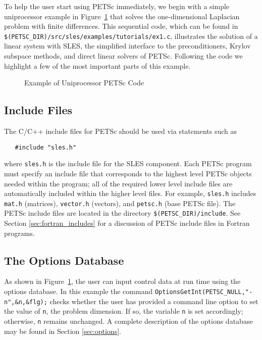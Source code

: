 To help the user start using PETSc immediately, we begin with a simple
uniprocessor example in Figure~\ref{fig:example1} that solves the
one-dimensional Laplacian problem with finite differences.  This
sequential code, which can be found in 
{\tt \$(PETSC\_DIR)/src/sles/examples/tutorials/ex1.c},
illustrates the solution of a linear system with SLES, the simplified
interface to the preconditioners, Krylov subspace methods, and direct
linear solvers of PETSc.  Following the code we highlight a few of the most important
parts of this example.  

\begin{figure}[H]
{\footnotesize
{}
}
\caption{Example of Uniprocessor PETSc Code}
\label{fig:example1}
\end{figure}

\subsection*{Include Files}

The C/C++ include files for PETSc should be used via statements such as
\begin{verbatim}
   #include "sles.h"
\end{verbatim}
where {\tt sles.h} is the include file for the SLES component.
Each PETSc program must specify an
include file that corresponds to the highest level PETSc objects
needed within the program; all of the required lower level include
files are automatically included within the higher level files.  For
example, {\tt sles.h} includes {\tt mat.h} (matrices),
{\tt vector.h} (vectors), and {\tt petsc.h} (base PETSc file).  
The PETSc include files are located in the directory 
{\tt \$(PETSC\_DIR)/include}.  See Section \ref{sec:fortran_includes}
for a discussion of PETSc include files in Fortran programs.

\subsection*{The Options Database}

As shown in Figure~\ref{fig:example1}, the user can input control data
at run time using the options database. In this example the command
{\tt OptionsGetInt(PETSC\_NULL,"-n",\&n,\&flg);} checks whether the user has
provided a command line option to set the value of {\tt n}, the
problem dimension.  If so, the variable {\tt n} is set accordingly;
otherwise, {\tt n} remains unchanged. A complete description of the
options database may be found in Section \ref{sec:options}.

